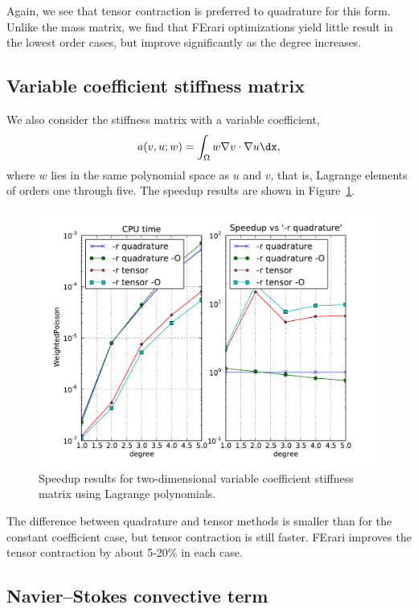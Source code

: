 Again, we see that tensor contraction is preferred to quadrature for
this form. Unlike the mass matrix, we find that FErari optimizations
yield little result in the lowest order cases, but improve
significantly as the degree increases.

\subsection{Variable coefficient stiffness matrix}

We also consider the stiffness matrix with a variable coefficient,
\begin{equation}
  a(v, u; w) = \int_{\Omega} w \nabla v \cdot \nabla u \dx,
\end{equation}
where \( w \) lies in the same polynomial space as \( u \) and \( v\),
that is, Lagrange elements of orders one through five. The speedup
results are shown in Figure~\ref{fig:WeightedPoisson}.

\begin{figure}
  \begin{center}
    \includegraphics[width=12cm]{chapters/kirby-3/pdf/WeightedPoisson.pdf}
    \caption{Speedup results for two-dimensional variable coefficient stiffness matrix using Lagrange polynomials.}
    \label{fig:WeightedPoisson}
  \end{center}
\end{figure}
The difference between quadrature and tensor methods is smaller than
for the constant coefficient case, but tensor contraction is still
faster. FErari improves the tensor contraction by about 5-20\% in each
case.

\subsection{Navier--Stokes convective term}

